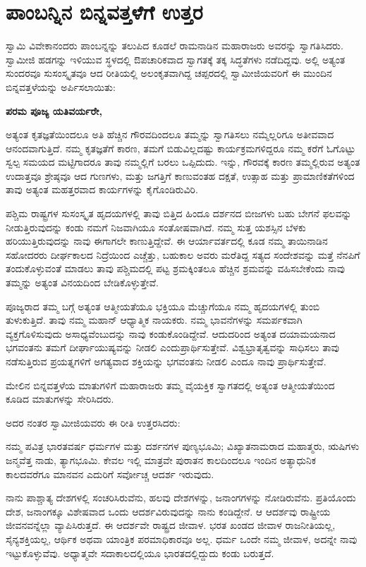 
\chapter{ಪಾಂಬನ್ನಿನ ಬಿನ್ನವತ್ತಳೆಗೆ ಉತ್ತರ}

ಸ್ವಾಮಿ ವಿವೇಕಾನಂದರು ಪಾಂಬನ್ನನ್ನು ತಲುಪಿದ ಕೂಡಲೆ ರಾಮನಾಡಿನ ಮಹಾರಾಜರು ಅವರನ್ನು ಸ್ವಾಗತಿಸಿದರು. ಸ್ವಾಮೀಜಿ ಹಡಗನ್ನು ಇಳಿಯುವ ಸ್ಥಳದಲ್ಲಿ ಔಪಚಾರಿಕವಾದ ಸ್ವಾಗತಕ್ಕೆ ತಕ್ಕ ಸಿದ್ಧತೆಗಳು ನಡೆದಿದ್ದವು. ಅಲ್ಲಿ ಅತ್ಯಂತ ಸುಂದರವೂ ಸುಸಂಸ್ಕೃತವೂ ಆದ ರೀತಿಯಲ್ಲಿ ಅಲಂಕೃತವಾಗಿದ್ದ ಚಪ್ಪರದಲ್ಲಿ ಸ್ವಾಮೀಜಿಯವರಿಗೆ ಈ ಮುಂದಿನ ಬಿನ್ನವತ್ತಳೆಯನ್ನು ಅರ್ಪಿಸಲಾಯಿತು:

\textbf{ಪರಮ ಪೂಜ್ಯ ಯತಿವರ್ಯರೇ, }

ಅತ್ಯಂತ ಕೃತಜ್ಞತೆಯಿಂದಲೂ ಅತಿ ಹೆಚ್ಚಿನ ಗೌರವದಿಂದಲೂ ತಮ್ಮನ್ನು ಸ್ವಾಗತಿಸಲು ನಮ್ಮೆಲ್ಲರಿಗೂ ಅತೀವವಾದ ಆನಂದವಾಗುತ್ತಿದೆ. ನಮ್ಮ ಕೃತಜ್ಞತೆಗೆ ಕಾರಣ, ತಮಗೆ ಬಿಡುವಿಲ್ಲದಷ್ಟು ಕಾರ್ಯಕ್ರಮಗಳಿದ್ದರೂ ನಮ್ಮ ಕರೆಗೆ ಓಗೊಟ್ಟು ಸ್ವಲ್ಪ ಸಮಯದ ಮಟ್ಟಿಗಾದರೂ ತಾವು ನಮ್ಮಲ್ಲಿಗೆ ಬರಲು ಒಪ್ಪಿದುದು. ಇನ್ನು, ಗೌರವಕ್ಕೆ ಕಾರಣ ತಮ್ಮಲ್ಲಿರುವ ಅತ್ಯಂತ ಉದಾತ್ತವೂ ಶ್ರೇಷ್ಠವೂ ಆದ ಗುಣಗಳು, ಮತ್ತು ಜಗತ್ತಿಗೆ ಕಾಣುವಂತಹ ದಕ್ಷತೆ, ಉತ್ಸಾಹ ಮತ್ತು ಪ್ರಾಮಾಣಿಕತೆಗಳಿಂದ ತಾವು ಅತ್ಯಂತ ಮಹತ್ತರವಾದ ಕಾರ್ಯಗಳನ್ನು ಕೈಗೊಂಡಿರುವಿರಿ. 

ಪಶ್ಚಿಮ ರಾಷ್ಟ್ರಗಳ ಸುಸಂಸ್ಕೃತ ಹೃದಯಗಳಲ್ಲಿ ತಾವು ಬಿತ್ತಿದ ಹಿಂದೂ ದರ್ಶನದ ಬೀಜಗಳು ಬಹು ಬೇಗನೆ ಫಲವನ್ನು ನೀಡುತ್ತಿರುವುದನ್ನು ಕಂಡು ನಮಗೆ ನಿಜವಾಗಿಯೂ ಸಂತೋಷವಾಗಿದೆ. ನಮ್ಮ ಸುತ್ತ ಯಶಸ್ಸಿನ ಬೆಳಕು ಹರಿಯುತ್ತಿರುವುದನ್ನು ನಾವು ಈಗಾಗಲೇ ಕಾಣುತ್ತಿದ್ದೇವೆ. ಈ ಆರ್ಯಾವರ್ತದಲ್ಲಿ ಕೂಡ ನಮ್ಮ ತಾಯಿನಾಡಿನ ಸಹೋದರರು ದೀರ್ಘಕಾಲದ ನಿದ್ರೆಯಿಂದ ಎಚ್ಚೆತ್ತು, ಬಹುಕಾಲ ಅವರು ಮರೆತಿದ್ದ ಸತ್ಯದ ಸಂದೇಶವನ್ನು ಮತ್ತೆ ನೆನಪಿಗೆ ತಂದುಕೊಳ್ಳುವಂತೆ ಮಾಡಲು ತಾವು ಪಶ್ಚಿಮದಲ್ಲಿ ಪಟ್ಟ ಶ್ರಮಕ್ಕಿಂತಲೂ ಹೆಚ್ಚಿನ ಶ್ರಮವನ್ನು ವಹಿಸಬೇಕೆಂದು ನಾವು ತಮ್ಮನ್ನು ಅತ್ಯಂತ ವಿನಯದಿಂದ ಬೇಡಿಕೊಳ್ಳುತ್ತೇವೆ. 

ಪೂಜ್ಯರಾದ ತಮ್ಮ ಬಗ್ಗೆ ಅತ್ಯಂತ ಆತ್ಮೀಯತೆಯೂ ಭಕ್ತಿಯೂ ಮೆಚ್ಚುಗೆಯೂ ನಮ್ಮ ಹೃದಯಗಳಲ್ಲಿ ತುಂಬಿ ತುಳುಕುತ್ತಿದೆ. ತಾವು ನಮ್ಮ ಮಹಾನ್​ ಆಧ್ಯಾತ್ಮಿಕ ನಾಯಕರು. ನಮ್ಮ ಭಾವನೆಗಳನ್ನು ಸಮರ್ಪಕವಾಗಿ ವ್ಯಕ್ತಗೊಳಿಸುವುದು ಅಸಾಧ್ಯವೆಂಬುದನ್ನು ನಾವು ಕಂಡುಕೊಂಡಿದ್ದೇವೆ. ಆದುದರಿಂದ ಅತ್ಯಂತ ದಯಾಮಯನಾದ ಭಗವಂತನು ತಮಗೆ ದೀರ್ಘಾಯುಷ್ಯವನ್ನು ನೀಡಲಿ ಎಂದು\break ಪ್ರಾರ್ಥಿಸುತ್ತೇವೆ. ವಿಶ್ವಭ್ರಾತೃತ್ವವನ್ನು ಸಾಧಿಸಲು ತಾವು ನಡೆಸುತ್ತಿರುವ ಪ್ರಯತ್ನ\-ಗಳಿಗೆ ಅಗತ್ಯವಾದ ಶಕ್ತಿಯನ್ನು ಭಗವಂತನು ನೀಡಲಿ ಎಂದೂ ನಾವು ಪ್ರಾರ್ಥಿ\-ಸುತ್ತೇವೆ. 

ಮೇಲಿನ ಬಿನ್ನವತ್ತಳೆಯ ಮಾತುಗಳಿಗೆ ಮಹಾರಾಜರು ತಮ್ಮ ವೈಯಕ್ತಿಕ ಸ್ವಾಗತದಲ್ಲಿ ಅತ್ಯಂತ ಆತ್ಮೀಯತೆಯಿಂದ ಕೂಡಿದ ಮಾತುಗಳನ್ನು ಸೇರಿಸಿದರು. 

ಅದರ ನಂತರ ಸ್ವಾಮೀಜಿಯವರು ಈ ರೀತಿ ಉತ್ತರಸಿದರು:

ನಮ್ಮ ಪವಿತ್ರ ಭಾರತವರ್ಷ ಧರ್ಮಗಳ ಮತ್ತು ದರ್ಶನಗಳ ಪುಣ್ಯಭೂಮಿ; ವಿಖ್ಯಾತನಾಮರಾದ ಮಹಾತ್ಮರು, ಋಷಿಗಳು ಜನ್ಮವೆತ್ತ ನಾಡು, ತ್ಯಾಗಭೂಮಿ. ಕೇವಲ ಇಲ್ಲಿ ಮಾತ್ರವೇ ಪುರಾತನ ಕಾಲದಿಂದಲೂ ಇಂದಿನ ಅತ್ಯಾಧುನಿಕ ಕಾಲದವರೆಗೂ ಮಾನವನ ಎದುರಿಗೆ ಸರ್ವೋಚ್ಚ ಆದರ್ಶ ಇರುವುದು. 

ನಾನು ಪಾಶ್ಚಾತ್ಯ ದೇಶಗಳಲ್ಲಿ ಸಂಚರಿಸಿರುವೆನು, ಹಲವು ದೇಶಗಳನ್ನು, ಜನಾಂಗಗಳನ್ನು ನೋಡಿರುವೆನು. ಪ್ರತಿಯೊಂದು ದೇಶ, ಜನಾಂಗಕ್ಕೂ ವಿಶೇಷವಾದ ಒಂದು ಆದರ್ಶವಿರುವುದನ್ನು ನಾನು ಕಂಡಿದ್ದೇನೆ. ಆ ಆದರ್ಶವು ರಾಷ್ಟ್ರೀಯ ಜೀವನವನ್ನೆಲ್ಲಾ ವ್ಯಾಪಿಸಿರುತ್ತದೆ. ಈ ಆದರ್ಶವೇ ರಾಷ್ಟ್ರದ ಜೀವಾಳ. ಭರತ ಖಂಡದ ಜೀವಾಳ ರಾಜನೀತಿಯಲ್ಲ, ಸೈನ್ಯಶಕ್ತಿಯಲ್ಲ, ಆರ್ಥಿಕ ಅಥವಾ ಯಾಂತ್ರಿಕ ಪರಮಾಧಿಕಾರವೂ ಅಲ್ಲ. ಧರ್ಮ ಒಂದೇ ನಮ್ಮ ಜೀವಾಳ, ಅದನ್ನೇ ನಾವು ಇಟ್ಟುಕೊಳ್ಳುವೆವು. ಅಧ್ಯಾತ್ಮವೇ ಸದಾಕಾಲದಲ್ಲಿಯೂ ಭಾರತದಲ್ಲಿದ್ದುದು ಕಂಡು ಬರುತ್ತದೆ. 

